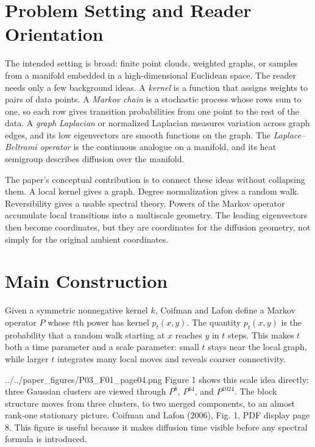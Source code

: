 \documentclass[11pt]{article}
\begin{document}
\section{Problem Setting and Reader Orientation}

The intended setting is broad: finite point clouds, weighted graphs, or
samples from a manifold embedded in a high-dimensional Euclidean space.  The
reader needs only a few background ideas.  A \emph{kernel} is a function that
assigns weights to pairs of data points.  A \emph{Markov chain} is a stochastic
process whose rows sum to one, so each row gives transition probabilities from
one point to the rest of the data.  A \emph{graph Laplacian} or normalized
Laplacian measures variation across graph edges, and its low eigenvectors are
smooth functions on the graph.  The \emph{Laplace--Beltrami operator} is the
continuous analogue on a manifold, and its heat semigroup describes diffusion
over the manifold.

The paper's conceptual contribution is to connect these ideas without
collapsing them.  A local kernel gives a graph.  Degree normalization gives a
random walk.  Reversibility gives a usable spectral theory.  Powers of the
Markov operator accumulate local transitions into a multiscale geometry.  The
leading eigenvectors then become coordinates, but they are coordinates for the
diffusion geometry, not simply for the original ambient coordinates.

\section{Main Construction}

Given a symmetric nonnegative kernel $k$, Coifman and Lafon define a Markov
operator $P$ whose $t$th power has kernel $p_t(x,y)$.  The quantity $p_t(x,y)$
is the probability that a random walk starting at $x$ reaches $y$ in $t$
steps.  This makes $t$ both a time parameter and a scale parameter: small
$t$ stays near the local graph, while larger $t$ integrates many local moves
and reveals coarser connectivity.

\paperfigure
  {../../paper_figures/P03_F01_page04.png}
  {Figure 1 shows this scale idea directly: three Gaussian clusters are
  viewed through $P^8$, $P^{64}$, and $P^{1024}$.  The block structure moves
  from three clusters, to two merged components, to an almost rank-one
  stationary picture.}
  {Coifman and Lafon (2006), Fig. 1, PDF display page 8.}
  {This figure is useful because it makes diffusion time visible before any
  spectral formula is introduced.}
\end{document}
